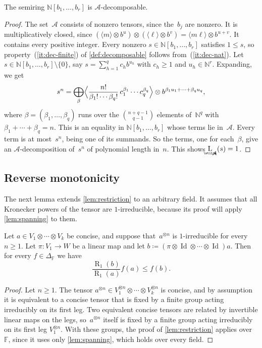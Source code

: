 \documentclass[11pt,letterpaper]{article}
\DeclareMathOperator{\asympdeclength}{\underaccent{\wtilde}{L}}
\DeclareMathOperator{\tensorrank}{R}
\newcommand{\FF}{\mathbb{F}}
\newcommand{\NN}{\mathbb{N}}
\DeclareMathOperator{\Id}{Id}
\begin{document}
\begin{lemma}\label{lem:mm-decomp}
The semiring $\NN[b_1, \ldots, b_r]$ is $\mathcal{A}$-decomposable.
\end{lemma}
\begin{proof}
The set~$\mathcal{A}$ consists of nonzero tensors, since the~$b_j$ are nonzero. It is multiplicatively closed, since $(\langle m \rangle \otimes b^{u})\otimes(\langle \ell \rangle \otimes b^{v}) = \langle m\ell \rangle \otimes b^{u+v}$. It contains every positive integer. Every nonzero $s \in \NN[b_1, \ldots, b_r]$ satisfies $1 \leq s$, so property~(\ref{it:dec-finite}) of \cref{def:decomposable} follows from~(\ref{it:dec-nat}). Let $s \in \NN[b_1, \ldots, b_r] \setminus \{0\}$, say $s = \sum_{h=1}^q c_h b^{u_h}$ with $c_h \geq 1$ and $u_h \in \NN^r$. Expanding, we get
\[
s^n = \bigoplus_{\beta} \Bigl\langle \frac{n!}{\beta_1! \cdots \beta_q!}\, c_1^{\beta_1} \cdots c_q^{\beta_q} \Bigr\rangle \otimes b^{\beta_1 u_1 + \cdots + \beta_q u_q},
\]
where $\beta = (\beta_1, \ldots, \beta_q)$ runs over the $\binom{n+q-1}{q-1}$ elements of~$\NN^q$ with $\beta_1 + \cdots + \beta_q = n$. This is an equality in $\NN[b_1, \ldots, b_r]$ whose terms lie in~$\mathcal{A}$. Every term is at most~$s^n$, being one of its summands. So the terms, one for each~$\beta$, give an $\mathcal{A}$-decomposition of~$s^n$ of polynomial length in~$n$. This shows $\asympdeclength_{\mathcal{A}}(s) = 1$.
\end{proof}

\subsection{Reverse monotonicity}\label{sec:reverse-any-field}

The next lemma extends \cref{lem:restriction} to an arbitrary field. It assumes that all Kronecker powers of the tensor are $1$-irreducible, because its proof will apply \cref{lem:spanning} to them.

\begin{lemma}\label{lem:restriction-any-field}
Let $a \in V_1 \otimes \cdots \otimes V_k$ be concise, and suppose that~$a^{\otimes n}$ is $1$-irreducible for every $n \geq 1$. Let $\pi : V_1 \to W$ be a linear map and let $b \coloneqq (\pi \otimes \Id \otimes \cdots \otimes \Id)a$. Then for every $f \in \Delta_\FF$ we have
\[
\frac{\tensorrank_1(b)}{\tensorrank_1(a)} f(a) \leq f(b).
\]
\end{lemma}
\begin{proof}
Let $n \geq 1$. The tensor $a^{\otimes n} \in V_1^{\otimes n} \otimes \cdots \otimes V_k^{\otimes n}$ is concise, and by assumption it is equivalent to a concise tensor that is fixed by a finite group acting irreducibly on its first leg. Two equivalent concise tensors are related by invertible linear maps on the legs, so~$a^{\otimes n}$ itself is fixed by a finite group acting irreducibly on its first leg $V_1^{\otimes n}$. With these groups, the proof of \cref{lem:restriction} applies over~$\FF$, since it uses only \cref{lem:spanning}, which holds over every field.
\end{proof}
\end{document}
